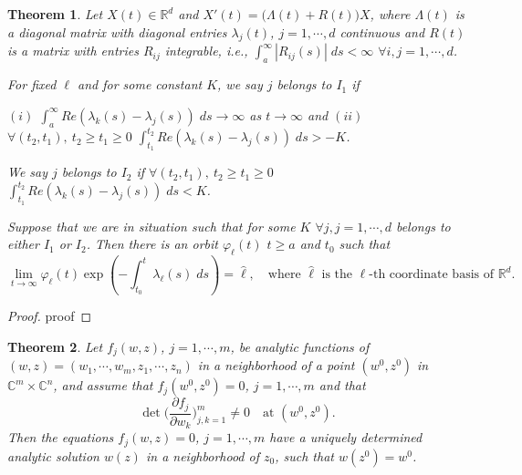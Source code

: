 \documentclass[a4paper,11pt]{article}
\def\blue{\color{blue}}
\newtheorem{theorem}{Theorem}
\theoremstyle{remark}
\begin{document}
\begin{theorem}{\cite[Diagonal Version]{CL1955}}\label{thm:CL} Let $X(t)\in \mathbb{R}^d$ and $X'(t) = \big(\Lambda(t) + R(t)\big)X$, where $\Lambda(t)$ is a diagonal matrix with diagonal entries $\lambda_j(t)$, $j=1,\cdots,d$ continuous and $R(t)$ is a matrix with entries $R_{ij}$ integrable, i.e., $\int_{a}^\infty |R_{ij}(s)|\; ds < \infty$ $\forall i,j=1,\cdots,d$. 

For fixed $\ell$ and for some constant $K$, we say $j$ belongs to $I_1$ if 

$(i)$ $\int_{a}^\infty Re(\lambda_k(s) -\lambda_j(s))\; ds \rightarrow \infty$ as $t \rightarrow \infty$ and $(ii)$ $\forall (t_2, t_1), \:t_2\ge t_1 \ge0$ $\int_{t_1}^{t_2} Re(\lambda_k(s) -\lambda_j(s))\; ds > -K$.

We say $j$ belongs to $I_2$ if $\forall (t_2, t_1), \: t_2\ge t_1 \ge0$ $\int_{t_1}^{t_2} Re(\lambda_k(s) -\lambda_j(s))\; ds < K$.

Suppose that we are in situation such that for some $K$ $\forall j, j=1,\cdots,d$ belongs to either $I_1$ or $I_2$. Then there is an orbit $\varphi_\ell(t)$ $t\ge a$ and $t_0$ such that
\begin{equation}
 \lim_{t \rightarrow \infty} \varphi_\ell(t) \exp\left(-\int_{t_0}^t \lambda_\ell(s)\; ds\right) = \hat{\ell}, \quad \text{where $\hat{\ell}$ is the $\ell$-th coordinate basis of $\mathbb{R}^d$.}
\end{equation}
\end{theorem}
\begin{proof}
{\blue proof}
\end{proof}

\begin{theorem}{\cite[p. 24]{L1966}} \label{thm:anal} Let $f_j(w,z)$, $j=1,\cdots,m$, be analytic functions of $(w,z)=(w_1,\cdots,w_m,z_1,\cdots,z_n)$ in a neighborhood of a point $(w^0,z^0)$ in $\mathbb{C}^m\times \mathbb{C}^n$, and assume that $f_j(w^0,z^0)=0$, $j=1,\cdots,m$ and that
$$ \det\Big( \frac{\partial f_j}{\partial w_k} \Big)_{j,k=1}^m \ne 0 \quad \text{at $(w^0,z^0)$}.$$
Then the equations $f_j(w,z)=0$, $j=1,\cdots,m$ have a uniquely determined analytic solution $w(z)$ in a neighborhood of $z_0$, such that $w(z^0)=w^0$.
\end{theorem}
\end{document}
